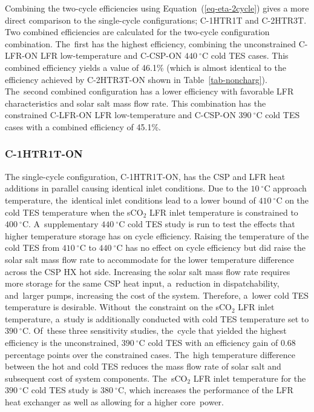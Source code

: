 \documentclass[sustainability,article,accept,moreauthors,pdftex]{Definitions/mdpi}
\begin{document}
\begin{paracol}{2}
Combining the two-cycle efficiencies using Equation~(\ref{eq-eta-2cycle}) gives a more direct comparison to the single-cycle configurations; C-1HTR1T and C-2HTR3T. Two combined efficiencies are calculated for the two-cycle configuration combination. The~first has the highest efficiency, combining the unconstrained C-LFR-ON LFR low-temperature and C-CSP-ON $440~^{\circ}$C cold TES cases. This combined efficiency yields a value of 46.1\% (which is almost identical to the efficiency achieved by C-2HTR3T-ON shown in Table~\ref{tab-noncharg}). The~second combined configuration has a lower efficiency with favorable LFR characteristics and solar salt mass flow rate. This combination has the constrained C-LFR-ON LFR low-temperature and C-CSP-ON $390~^{\circ}$C cold TES cases with a combined efficiency of 45.1\%. 


\subsubsection{C-1HTR1T-ON}
The single-cycle configuration, C-1HTR1T-ON, has the CSP and LFR heat additions in parallel causing identical inlet conditions. Due to the $10~^{\circ}$C approach temperature, the~identical inlet conditions lead to a lower bound of $410~^{\circ}$C on the cold TES temperature when the sCO$_2$ LFR inlet temperature is constrained to $400~^{\circ}$C. A~supplementary $440~^{\circ}$C cold TES study is run to test the effects that higher temperature storage has on cycle efficiency. Raising the temperature of the cold TES from $410~^{\circ}$C to $440~^{\circ}$C has no effect on cycle efficiency but did raise the solar salt mass flow rate to accommodate for the lower temperature difference across the CSP HX hot side. Increasing the solar salt mass flow rate requires more storage for the same CSP heat input, a~reduction in dispatchability, and~larger pumps, increasing the cost of the system. Therefore, a~lower cold TES temperature is desirable. Without~the constraint on the sCO$_2$ LFR inlet temperature, a~study is additionally conducted with cold TES temperature set to $390~^{\circ}$C. Of~these three sensitivity studies, the~cycle that yielded the highest efficiency is the unconstrained, $390~^{\circ}$C cold TES with an efficiency gain of 0.68 percentage points over the constrained cases. The~high temperature difference between the hot and cold TES reduces the mass flow rate of solar salt and subsequent cost of system components. The~sCO$_2$ LFR inlet temperature for the $390~^{\circ}$C cold TES study is $380~^{\circ}$C, which increases the performance of the LFR heat exchanger as well as allowing for a higher core~power. 


\end{paracol}
\end{document}
